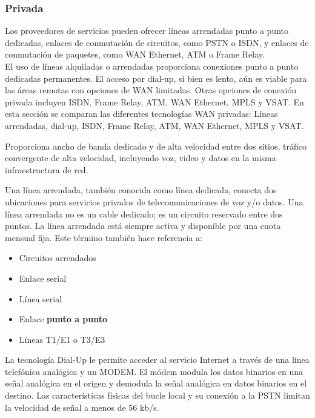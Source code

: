 \documentclass[
	12pt, %
	fleqn, %
	a4paper, %
	oneside, %
]{LegrandOrangeBook}
\begin{document}
\subsubsection{Privada}
Los proveedores de servicios pueden ofrecer líneas arrendadas punto a punto dedicadas, enlaces de conmutación de circuitos, como PSTN o ISDN, y enlaces de conmutación de paquetes, como WAN Ethernet, ATM o Frame Relay.\\
El uso de líneas alquiladas o arrendadas proporciona conexiones punto a punto dedicadas permanentes. El acceso por dial-up, si bien es lento, aún es viable para las áreas remotas con opciones de WAN limitadas. Otras opciones de conexión privada incluyen ISDN, Frame Relay, ATM, WAN Ethernet, MPLS y VSAT. En esta sección se comparan las diferentes tecnologías WAN privadas: Líneas arrendadas, dial-up, ISDN, Frame Relay, ATM, WAN Ethernet, MPLS y VSAT.
\begin{definition}
Proporciona ancho de banda dedicado y de alta velocidad entre dos sitios, tráfico convergente de alta velocidad, incluyendo voz, video y datos en la misma infraestructura de red.
\end{definition}
\begin{definition}
Una línea arrendada, también conocida como línea dedicada, conecta dos ubicaciones para servicios privados de telecomunicaciones de voz y/o datos. Una línea arrendada no es un cable dedicado; es un circuito reservado entre dos puntos. La línea arrendada está siempre activa y disponible por una cuota mensual fija. Este término también hace referencia a:
\begin{itemize}
\item Circuitos arrendados
\item Enlace serial
\item Línea serial
\item Enlace \textbf{punto a punto}
\item Líneas T1/E1 o T3/E3
\end{itemize}
\end{definition}
\begin{definition}[Dial Up]
La tecnología Dial-Up le permite acceder al servicio Internet a través de una línea telefónica analógica y un MODEM. El módem modula los datos binarios en una  señal analógica en el origen y demodula la señal  analógica en datos binarios en el destino. Las características físicas del bucle local y su  conexión a la PSTN limitan la velocidad de señal  a menos de 56 kb/s.
\end{definition}
\end{document}
